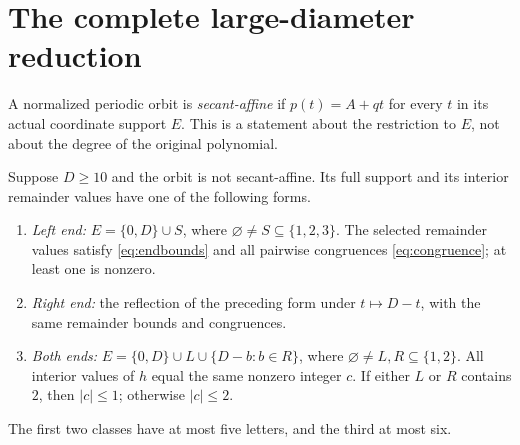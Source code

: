 \section{The complete large-diameter reduction}\label{sec:reduction}

\begin{definition}
A normalized periodic orbit is \emph{secant-affine} if
$p(t)=A+qt$ for every $t$ in its actual coordinate support $E$.
This is a statement about the restriction to $E$, not about the
degree of the original polynomial.
\end{definition}

\begin{lemma}\label{lem:templates}
Suppose $D\ge10$ and the orbit is not secant-affine. Its full support
and its interior remainder values have one of the following forms.
\begin{enumerate}
\item \emph{Left end:} $E=\{0,D\}\cup S$, where
$\varnothing\ne S\subseteq\{1,2,3\}$. The selected remainder
values satisfy \eqref{eq:endbounds} and all pairwise congruences
\eqref{eq:congruence}; at least one is nonzero.
\item \emph{Right end:} the reflection of the preceding form under
$t\mapsto D-t$, with the same remainder bounds and congruences.
\item \emph{Both ends:}
$E=\{0,D\}\cup L\cup\{D-b:b\in R\}$, where
$\varnothing\ne L,R\subseteq\{1,2\}$. All interior values of $h$
equal the same nonzero integer $c$. If either $L$ or $R$ contains
$2$, then $|c|\le1$; otherwise $|c|\le2$.
\end{enumerate}
The first two classes have at most five letters, and the third
at most six.
\end{lemma}
